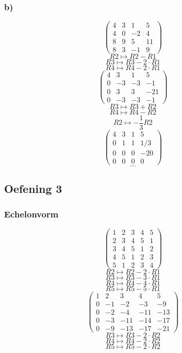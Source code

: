 \documentclass[lineaire_algebra_oplossingen.tex]{subfiles}
\begin{document}
\subsubsection*{b)}
\[
\begin{pmatrix}
4 & 3 & 1 & 5\\
4 & 0 & -2 & 4\\
8 & 9 & 5 & 11\\
8 & 3 & -1 & 9
\end{pmatrix}
\]
\[ R2 \longmapsto R2 - R1\]
\[ R3 \longmapsto R3 - 2\cdot R1\]
\[ R4 \longmapsto R4 - 2\cdot R1\]
\[
\begin{pmatrix}
4 & 3 & 1 & 5\\
0 & -3 & -3 & -1\\
0 & 3 & 3 & -21\\
0 & -3 & -3 & -1
\end{pmatrix}
\]
\[ R3 \longmapsto R3 + R2\]
\[ R4 \longmapsto R4 - R2\]
\[ R2 \longmapsto -\frac{1}{3}R2\]
\[
\begin{pmatrix}
4 & 3 & 1 & 5\\
0 & 1 & 1 & 1/3\\
0 & 0 & 0 & -20\\
0 & 0 & 0 & 0
\end{pmatrix}
\]
\[...\]

\subsection{Oefening 3}
\subsubsection*{Echelonvorm}
\[
\begin{pmatrix}
1 &  2 &  3 &  4 &  5\\
2 &  3 &  4 &  5 &  1\\
3 &  4 &  5 &  1 &  2\\
4 &  5 &  1 &  2 &  3\\
5 &  1 &  2 &  3 &  4 
\end{pmatrix}
\]
\[ R2 \longmapsto R2 -2\cdot R1\]
\[ R3 \longmapsto R3 -3\cdot R1\]
\[ R4 \longmapsto R4 -4\cdot R1\]
\[ R5 \longmapsto R5 -5\cdot R1\]
\[
\begin{pmatrix}
1 &  2 &  3 &  4 &  5 \\
0 & -1 & -2 & -3 & -9 \\
0 & -2 & -4 & -11& -13\\
0 & -3 & -11& -14& -17\\
0 & -9 & -13& -17& -21
\end{pmatrix}
\]
\[ R3 \longmapsto R3 -2\cdot R2\]
\[ R4 \longmapsto R4 -2\cdot R2\]
\[ R5 \longmapsto R5 -2\cdot R2\]
\end{document}
